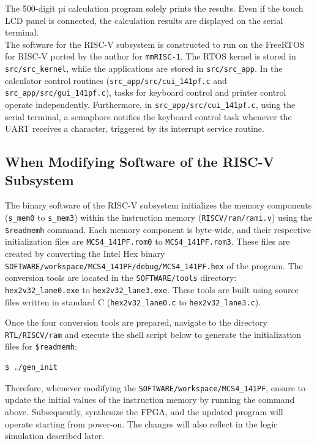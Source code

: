 The 500-digit pi calculation program solely prints the results. Even if the touch LCD panel is connected, the calculation results are displayed on the serial terminal.\\

The software for the RISC-V subsystem is constructed to run on the FreeRTOS for RISC-V ported by the author for \texttt{mmRISC-1}. The RTOS kernel is stored in \texttt{src/src\_kernel}, while the applications are stored in \texttt{src/src\_app}. In the calculator control routines (\texttt{src\_app/src/cui\_141pf.c} and \texttt{src\_app/src/gui\_141pf.c}), tasks for keyboard control and printer control operate independently. Furthermore, in \texttt{src\_app/src/cui\_141pf.c}, using the serial terminal, a semaphore notifies the keyboard control task whenever the UART receives a character, triggered by its interrupt service routine.

\subsection{When Modifying Software of the RISC-V Subsystem}
The binary software of the RISC-V subsystem initializes the memory components (\texttt{s\_mem0} to \texttt{s\_mem3}) within the instruction memory (\texttt{RISCV/ram/rami.v}) using the \verb|$readmemh| command. Each memory component is byte-wide, and their respective initialization files are \texttt{MCS4\_141PF.rom0} to \texttt{MCS4\_141PF.rom3}. These files are created by converting the Intel Hex binary \texttt{SOFTWARE/workspace/MCS4\_141PF/debug/MCS4\_141PF.hex} of the program. The conversion tools are located in the \texttt{SOFTWARE/tools} directory: \texttt{hex2v32\_lane0.exe} to \texttt{hex2v32\_lane3.exe}. These tools are built using source files written in standard C (\texttt{hex2v32\_lane0.c} to \texttt{hex2v32\_lane3.c}).

Once the four conversion tools are prepared, navigate to the directory \texttt{RTL/RISCV/ram} and execute the shell script below to generate the initialization files for \verb|$readmemh|:

\begin{verbatim}
$ ./gen_init
\end{verbatim}

Therefore, whenever modifying the \texttt{SOFTWARE/workspace/MCS4\_141PF}, ensure to update the initial values of the instruction memory by running the command above. Subsequently, synthesize the FPGA, and the updated program will operate starting from power-on. The changes will also reflect in the logic simulation described later.


